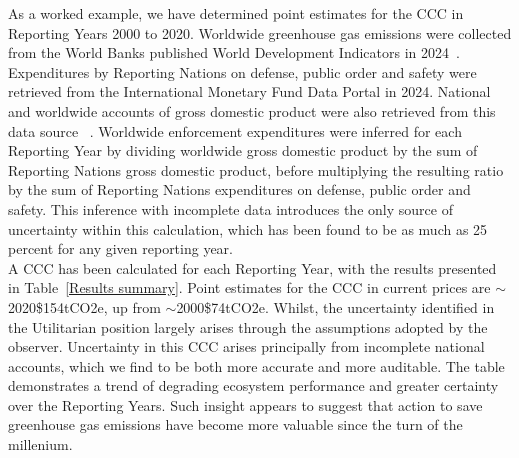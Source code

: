 \documentclass[10pt, oneside]{article}   	%
\begin{document}
As a worked example, we have determined point estimates for the CCC in Reporting Years 2000 to 2020.
Worldwide greenhouse gas emissions were collected from the World Banks published World Development Indicators in 2024~\cite{wbank}.
Expenditures by Reporting Nations on defense, public order and safety were retrieved from the International Monetary Fund Data Portal in 2024.
National and worldwide accounts of gross domestic product were also retrieved from this data source ~\cite{imf}.
Worldwide enforcement expenditures were inferred for each Reporting Year by dividing worldwide gross domestic product by the sum of Reporting Nations gross domestic product, before multiplying the resulting ratio by the sum of Reporting Nations expenditures on defense, public order and safety.
This inference with incomplete data introduces the only source of uncertainty within this calculation, which has been found to be as much as 25 percent for any given reporting year.\\

A CCC has been calculated for each Reporting Year, with the results presented in Table~\ref{Results summary}.
Point estimates for the CCC in current prices are $\sim$2020\$154tCO2e, up from $\sim$2000\$74tCO2e.
Whilst, the uncertainty identified in the Utilitarian position largely arises through the assumptions adopted by the observer.
Uncertainty in this CCC arises principally from incomplete national accounts, which we find to be both more accurate and more auditable.
The table demonstrates a trend of degrading ecosystem performance and greater certainty over the Reporting Years.
Such insight appears to suggest that action to save greenhouse gas emissions have become more valuable since the turn of the millenium.\\
\end{document}
